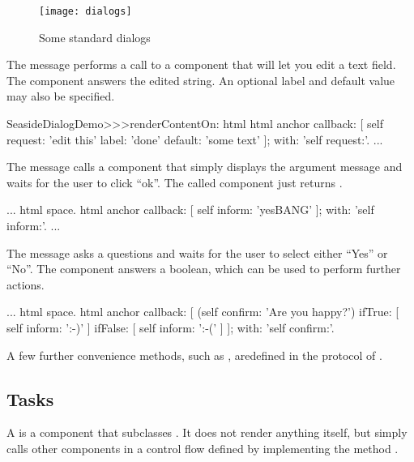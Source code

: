 \documentclass[a4paper,10pt,twoside]{book}
\begin{document}
\begin{figure}[b]
\begin{center}
\texttt{[image: dialogs]}
\caption{Some standard dialogs}
\end{center}
\end{figure}

The message  performs a call to a component that will let
you edit a text field.
The component answers the edited string.
An optional label and default value may also be specified.

\begin{code}{}
SeasideDialogDemo>>>renderContentOn: html
	html anchor
		callback: [ self request: 'edit this' label: 'done' default: 'some text' ];
		with: 'self request:'.
...
\end{code}

The message  calls a component that simply displays the
argument message and waits for the user to click ``ok''.
The called component just returns .

\begin{code}{}
...
	html space.
	html anchor
		callback: [ self inform: 'yesBANG' ];
		with: 'self inform:'.
...
\end{code}

The message  asks a questions and waits for the user to
select either ``Yes'' or ``No''.
The component answers a boolean, which can be used to perform further actions.

\begin{code}{}
...
	html space.
	html anchor
		callback: [
			(self confirm: 'Are you happy?')
				ifTrue: [ self inform: ':-)' ]
				ifFalse: [ self inform: ':-(' ]
			];
		with: 'self confirm:'.
\end{code}

A few further convenience methods, such as , aredefined in the  protocol of .

\subsection{Tasks}

A  is a component that subclasses .
It does not render anything itself, but simply calls other components in a control flow
defined by implementing the method .
\end{document}
